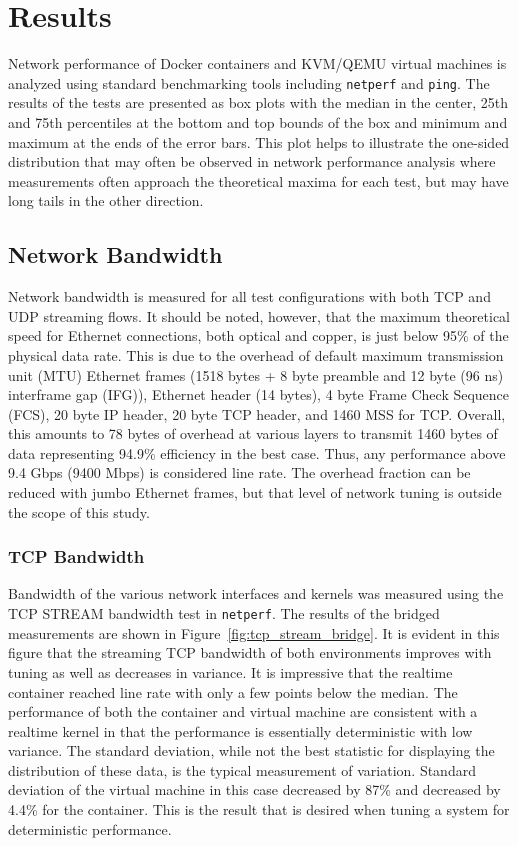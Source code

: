 \chapter{Results}
\label{sec:results}
Network performance of Docker containers and KVM/QEMU virtual machines is analyzed using standard benchmarking tools including \texttt{netperf} and \texttt{ping}.  
The results of the tests are presented as box plots with the median in the center, 25th and 75th percentiles at the bottom and top bounds of the box and minimum and maximum at the ends of the error bars.
This plot helps to illustrate the one-sided distribution that may often be observed in network performance analysis where measurements often approach the theoretical maxima for each test, but may have long tails in the other direction.  

\section{Network Bandwidth} %
\label{sec:networkbandwidth}
Network bandwidth is measured for all test configurations with both TCP and UDP streaming flows.
It should be noted, however, that the maximum theoretical speed for Ethernet connections, both optical and copper, is just below 95\% of the physical data rate.
This is due to the overhead of default maximum transmission unit (MTU) Ethernet frames (1518 bytes + 8 byte preamble and 12 byte (96 ns) interframe gap (IFG)), Ethernet header (14 bytes), 4 byte Frame Check Sequence (FCS), 20 byte IP header, 20 byte TCP header, and 1460 MSS for TCP.
Overall, this amounts to 78 bytes of overhead at various layers to transmit 1460 bytes of data representing 94.9\% efficiency in the best case.  
Thus, any performance above 9.4 Gbps (9400 Mbps) is considered line rate.  
The overhead fraction can be reduced with jumbo Ethernet frames, but that level of network tuning is outside the scope of this study.

\subsection{TCP Bandwidth} %
\label{sub:tcpbandwidth}
Bandwidth of the various network interfaces and kernels was measured using the TCP STREAM bandwidth test in \texttt{netperf}.
The results of the bridged measurements are shown in Figure~\ref{fig:tcp_stream_bridge}. 
It is evident in this figure that the streaming TCP bandwidth of both environments improves with tuning as well as decreases in variance.  
It is impressive that the realtime container reached line rate with only a few points below the median.  
The performance of both the container and virtual machine are consistent with a realtime kernel in that the performance is essentially deterministic with low variance.
The standard deviation, while not the best statistic for displaying the distribution of these data, is the typical measurement of variation.
Standard deviation of the virtual machine in this case decreased by 87\% and decreased by 4.4\% for the container.  
This is the result that is desired when tuning a system for deterministic performance.

